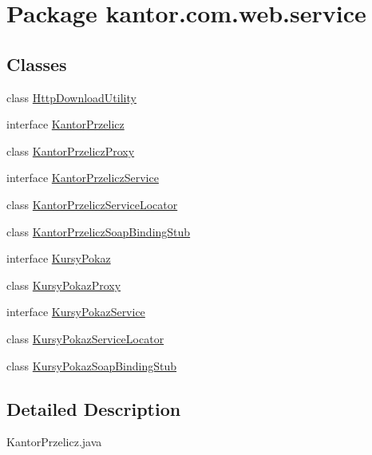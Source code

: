 \hypertarget{namespacekantor_1_1com_1_1web_1_1service}{\section{Package kantor.\+com.\+web.\+service}
\label{namespacekantor_1_1com_1_1web_1_1service}
}
\subsection*{Classes}
\begin{DoxyCompactItemize}
\item 
class \hyperlink{classkantor_1_1com_1_1web_1_1service_1_1_http_download_utility}{Http\+Download\+Utility}
\item 
interface \hyperlink{classkantor_1_1com_1_1web_1_1service_1_1_kantor_przelicz}{Kantor\+Przelicz}
\item 
class \hyperlink{classkantor_1_1com_1_1web_1_1service_1_1_kantor_przelicz_proxy}{Kantor\+Przelicz\+Proxy}
\item 
interface \hyperlink{interfacekantor_1_1com_1_1web_1_1service_1_1_kantor_przelicz_service}{Kantor\+Przelicz\+Service}
\item 
class \hyperlink{classkantor_1_1com_1_1web_1_1service_1_1_kantor_przelicz_service_locator}{Kantor\+Przelicz\+Service\+Locator}
\item 
class \hyperlink{classkantor_1_1com_1_1web_1_1service_1_1_kantor_przelicz_soap_binding_stub}{Kantor\+Przelicz\+Soap\+Binding\+Stub}
\item 
interface \hyperlink{classkantor_1_1com_1_1web_1_1service_1_1_kursy_pokaz}{Kursy\+Pokaz}
\item 
class \hyperlink{classkantor_1_1com_1_1web_1_1service_1_1_kursy_pokaz_proxy}{Kursy\+Pokaz\+Proxy}
\item 
interface \hyperlink{interfacekantor_1_1com_1_1web_1_1service_1_1_kursy_pokaz_service}{Kursy\+Pokaz\+Service}
\item 
class \hyperlink{classkantor_1_1com_1_1web_1_1service_1_1_kursy_pokaz_service_locator}{Kursy\+Pokaz\+Service\+Locator}
\item 
class \hyperlink{classkantor_1_1com_1_1web_1_1service_1_1_kursy_pokaz_soap_binding_stub}{Kursy\+Pokaz\+Soap\+Binding\+Stub}
\end{DoxyCompactItemize}


\subsection{Detailed Description}
Kantor\+Przelicz.\+java

